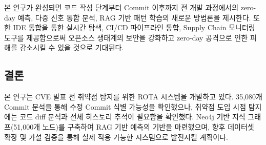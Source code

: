 ﻿\documentclass[conference]{IEEEtran}
\begin{document}
본 연구가 완성되면 코드 작성 단계부터 Commit 이후까지 전 개발 과정에서의 zero-day 예측, 다중 신호 통합 분석, RAG 기반 패턴 학습의 새로운 방법론을 제시한다. 또한 IDE 통합을 통한 실시간 탐색, CI/CD 파이프라인 통합, Supply Chain 모니터링 도구를 제공함으로써 오픈소스 생태계의 보안을 강화하고 zero-day 공격으로 인한 피해를 감소시킬 수 있을 것으로 기대된다.

\subsection{결론}

본 연구는 CVE 발표 전 취약점 탐지를 위한 ROTA 시스템을 개발하고 있다. 35,080개 Commit 분석을 통해 수정 Commit 식별 가능성을 확인했으나, 취약점 도입 시점 탐지에는 코드 diff 분석과 전체 히스토리 추적이 필요함을 확인했다. Neo4j 기반 지식 그래프(51,000개 노드)를 구축하여 RAG 기반 예측의 기반을 마련했으며, 향후 데이터셋 확장 및 가설 검증을 통해 실제 적용 가능한 시스템으로 발전시킬 계획이다.
\end{document}

